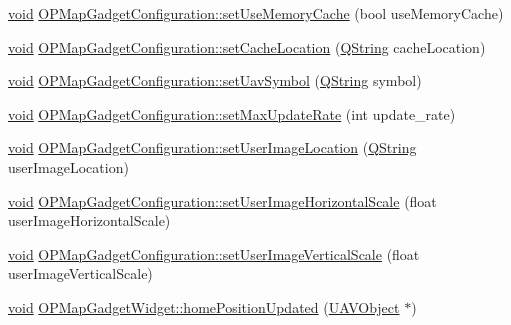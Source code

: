 \begin{DoxyCompactItemize}
\item 
\hyperlink{group___u_a_v_objects_plugin_ga444cf2ff3f0ecbe028adce838d373f5c}{void} \hyperlink{group___o_p_map_plugin_gaf9f7efc1e46ac61b758479e530a3123a}{\-O\-P\-Map\-Gadget\-Configuration\-::set\-Use\-Memory\-Cache} (bool use\-Memory\-Cache)
\item 
\hyperlink{group___u_a_v_objects_plugin_ga444cf2ff3f0ecbe028adce838d373f5c}{void} \hyperlink{group___o_p_map_plugin_ga1535dec7606615519b068c23a1ca2732}{\-O\-P\-Map\-Gadget\-Configuration\-::set\-Cache\-Location} (\hyperlink{group___u_a_v_objects_plugin_gab9d252f49c333c94a72f97ce3105a32d}{\-Q\-String} cache\-Location)
\item 
\hyperlink{group___u_a_v_objects_plugin_ga444cf2ff3f0ecbe028adce838d373f5c}{void} \hyperlink{group___o_p_map_plugin_gad3440c50dc4df5efc75c2e9c495bd87c}{\-O\-P\-Map\-Gadget\-Configuration\-::set\-Uav\-Symbol} (\hyperlink{group___u_a_v_objects_plugin_gab9d252f49c333c94a72f97ce3105a32d}{\-Q\-String} symbol)
\item 
\hyperlink{group___u_a_v_objects_plugin_ga444cf2ff3f0ecbe028adce838d373f5c}{void} \hyperlink{group___o_p_map_plugin_gaf7ae2720705ea7adc0d5ae53aca97ecc}{\-O\-P\-Map\-Gadget\-Configuration\-::set\-Max\-Update\-Rate} (int update\-\_\-rate)
\item 
\hyperlink{group___u_a_v_objects_plugin_ga444cf2ff3f0ecbe028adce838d373f5c}{void} \hyperlink{group___o_p_map_plugin_ga4d5dd75bf8d9fc4a61f9b4ccb1073326}{\-O\-P\-Map\-Gadget\-Configuration\-::set\-User\-Image\-Location} (\hyperlink{group___u_a_v_objects_plugin_gab9d252f49c333c94a72f97ce3105a32d}{\-Q\-String} user\-Image\-Location)
\item 
\hyperlink{group___u_a_v_objects_plugin_ga444cf2ff3f0ecbe028adce838d373f5c}{void} \hyperlink{group___o_p_map_plugin_ga0e854a0411317eadea17f6982d319157}{\-O\-P\-Map\-Gadget\-Configuration\-::set\-User\-Image\-Horizontal\-Scale} (float user\-Image\-Horizontal\-Scale)
\item 
\hyperlink{group___u_a_v_objects_plugin_ga444cf2ff3f0ecbe028adce838d373f5c}{void} \hyperlink{group___o_p_map_plugin_ga90c2b51792e97ee806fe50d8215f3461}{\-O\-P\-Map\-Gadget\-Configuration\-::set\-User\-Image\-Vertical\-Scale} (float user\-Image\-Vertical\-Scale)
\item 
\hyperlink{group___u_a_v_objects_plugin_ga444cf2ff3f0ecbe028adce838d373f5c}{void} \hyperlink{group___o_p_map_plugin_gae67526d9495209b93360c1fae84e3d47}{\-O\-P\-Map\-Gadget\-Widget\-::home\-Position\-Updated} (\hyperlink{class_u_a_v_object}{\-U\-A\-V\-Object} $\ast$)

\end{DoxyCompactItemize}
